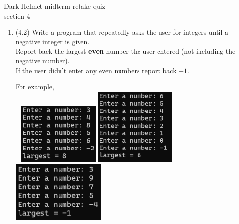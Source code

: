 \documentclass{article}
\begin{document}
\pagebreak
Dark Helmet \hfill midterm retake quiz\\
section 4\\
\begin{enumerate}
\item (4.2)  
		Write a program that repeatedly asks the user for integers until a negative integer is 
		given.\\  Report back the largest \textbf{even} number the user entered 
		(not including the negative number).  \\
		If the user didn't enter any even numbers report back $-1$.

		For example, \\ \ \hfill
		\includegraphics[height = 1.2in]{./imgs/largestEven1.PNG} \hfill  
		\includegraphics[height = 1.5in]{./imgs/largestEven2.PNG} \hfill  
		\includegraphics[height = 1.2in]{./imgs/largestEven3.PNG} \hfill \



\end{enumerate}
\end{document}
